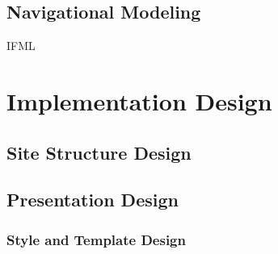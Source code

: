 \documentclass[a4paper]{report}
\begin{document}
\section{Navigational Modeling}
IFML












\chapter{Implementation Design}
\section{Site Structure Design}
\section{Presentation Design}
\subsection{Style and Template Design}
\end{document}
